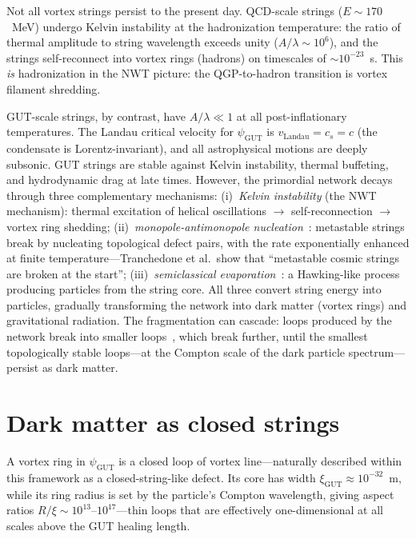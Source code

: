 \documentclass[11pt]{article}
\begin{document}
Not all vortex strings persist to the present day.
QCD-scale strings ($E \sim 170$~MeV) undergo Kelvin instability at the hadronization temperature: the ratio of thermal amplitude to string wavelength exceeds unity ($A/\lambda \sim 10^6$), and the strings self-reconnect into vortex rings (hadrons) on timescales of $\sim 10^{-23}$~s.
This \emph{is} hadronization in the NWT picture: the QGP-to-hadron transition is vortex filament shredding.

GUT-scale strings, by contrast, have $A/\lambda \ll 1$ at all post-inflationary temperatures.
The Landau critical velocity for $\psi_\text{GUT}$ is $v_\text{Landau} = c_s = c$ (the condensate is Lorentz-invariant), and all astrophysical motions are deeply subsonic.
GUT strings are stable against Kelvin instability, thermal buffeting, and hydrodynamic drag at late times.
However, the primordial network decays through three complementary mechanisms:
(i)~\emph{Kelvin instability} (the NWT mechanism): thermal excitation of helical oscillations $\to$ self-reconnection $\to$ vortex ring shedding;
(ii)~\emph{monopole-antimonopole nucleation}~\cite{Tranchedone2026}: metastable strings break by nucleating topological defect pairs, with the rate exponentially enhanced at finite temperature---Tranchedone et al.\ show that ``metastable cosmic strings are broken at the start'';
(iii)~\emph{semiclassical evaporation}~\cite{Penna2025}: a Hawking-like process producing particles from the string core.
All three convert string energy into particles, gradually transforming the network into dark matter (vortex rings) and gravitational radiation.
The fragmentation can cascade: loops produced by the network break into smaller loops~\cite{Auclair2025}, which break further, until the smallest topologically stable loops---at the Compton scale of the dark particle spectrum---persist as dark matter.


\section{Dark matter as closed strings}
\label{sec:dark-matter}

A vortex ring in $\psi_\text{GUT}$ is a closed loop of vortex line---naturally described within this framework as a closed-string-like defect.
Its core has width $\xi_\text{GUT} \approx 10^{-32}$~m, while its ring radius is set by the particle's Compton wavelength, giving aspect ratios $R/\xi \sim 10^{13}\text{--}10^{17}$---thin loops that are effectively one-dimensional at all scales above the GUT healing length.
\end{document}
